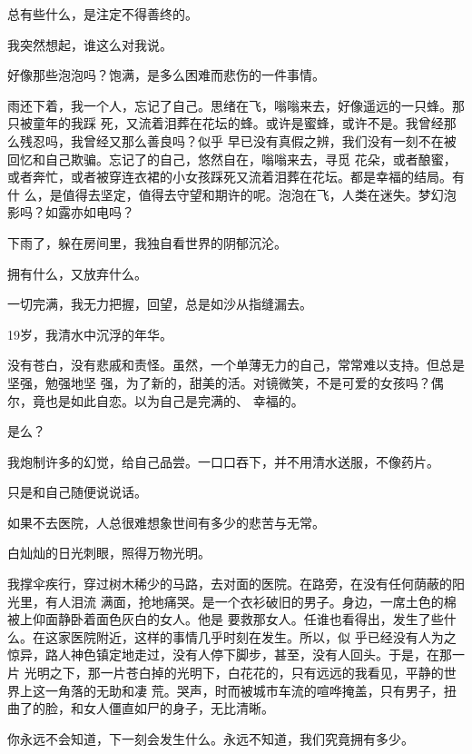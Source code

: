 		总有些什么，是注定不得善终的。

		我突然想起，谁这么对我说。

		好像那些泡泡吗？饱满，是多么困难而悲伤的一件事情。

		雨还下着，我一个人，忘记了自己。思绪在飞，嗡嗡来去，好像遥远的一只蜂。那只被童年的我踩
	死，又流着泪葬在花坛的蜂。或许是蜜蜂，或许不是。我曾经那么残忍吗，我曾经又那么善良吗？似乎
	早已没有真假之辨，我们没有一刻不在被回忆和自己欺骗。忘记了的自己，悠然自在，嗡嗡来去，寻觅
	花朵，或者酿蜜，或者奔忙，或者被穿连衣裙的小女孩踩死又流着泪葬在花坛。都是幸福的结局。有什
	么，是值得去坚定，值得去守望和期许的呢。泡泡在飞，人类在迷失。梦幻泡影吗？如露亦如电吗？

		下雨了，躲在房间里，我独自看世界的阴郁沉沦。

	\endwriting



		拥有什么，又放弃什么。

		一切完满，我无力把握，回望，总是如沙从指缝漏去。

		19岁，我清水中沉浮的年华。

		没有苍白，没有悲戚和责怪。虽然，一个单薄无力的自己，常常难以支持。但总是坚强，勉强地坚
	强，为了新的，甜美的活。对镜微笑，不是可爱的女孩吗？偶尔，竟也是如此自恋。以为自己是完满的、
	幸福的。

		是么？

		我炮制许多的幻觉，给自己品尝。一口口吞下，并不用清水送服，不像药片。

		只是和自己随便说说话。

	\endwriting



		如果不去医院，人总很难想象世间有多少的悲苦与无常。

		白灿灿的日光刺眼，照得万物光明。

		我撑伞疾行，穿过树木稀少的马路，去对面的医院。在路旁，在没有任何荫蔽的阳光里，有人泪流
	满面，抢地痛哭。是一个衣衫破旧的男子。身边，一席土色的棉被上仰面静卧着面色灰白的女人。他是
	要救那女人。任谁也看得出，发生了些什么。在这家医院附近，这样的事情几乎时刻在发生。所以，似
	乎已经没有人为之惊异，路人神色镇定地走过，没有人停下脚步，甚至，没有人回头。于是，在那一片
	光明之下，那一片苍白掉的光明下，白花花的，只有远远的我看见，平静的世界上这一角落的无助和凄
	荒。哭声，时而被城市车流的喧哗掩盖，只有男子，扭曲了的脸，和女人僵直如尸的身子，无比清晰。

		你永远不会知道，下一刻会发生什么。永远不知道，我们究竟拥有多少。

